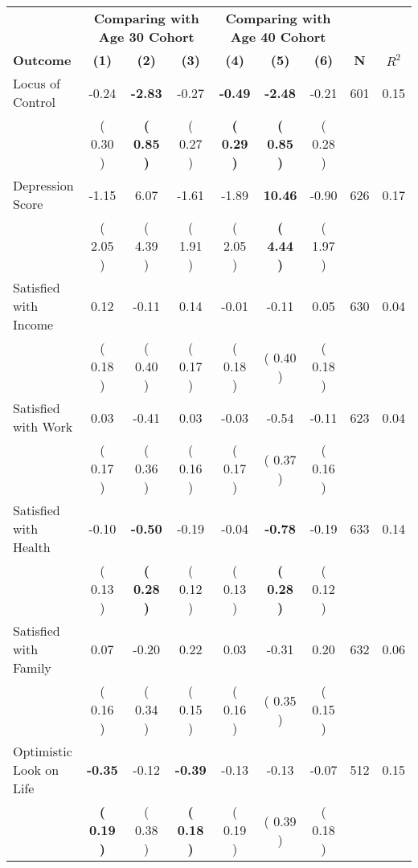 \begin{tabular}{lcccccccc}
\toprule
 & \multicolumn{3}{c}{\textbf{Comparing with Age 30 Cohort}} & \multicolumn{3}{c}{\textbf{Comparing with Age 40 Cohort}} & \\
\cmidrule(lr){2-4} \cmidrule(lr){5-7} 
 \textbf{Outcome} & \textbf{(1)} & \textbf{(2)} & \textbf{(3)} & \textbf{(4)} & \textbf{(5)} & \textbf{(6)} & \textbf{N} & \textbf{$ R^2$} \\
\midrule
Locus of Control &     -0.24 & \textbf{    -2.83} &     -0.27 & \textbf{    -0.49} & \textbf{    -2.48} &     -0.21 & 601 &       0.15 \\ 
 & (     0.30 ) & \textbf{(     0.85 )} & (     0.27 ) & \textbf{(     0.29 )} & \textbf{(     0.85 )} & (     0.28 ) & \\
Depression Score &     -1.15 &      6.07 &     -1.61 &     -1.89 & \textbf{    10.46} &     -0.90 & 626 &       0.17 \\ 
 & (     2.05 ) & (     4.39 ) & (     1.91 ) & (     2.05 ) & \textbf{(     4.44 )} & (     1.97 ) & \\
Satisfied with Income &      0.12 &     -0.11 &      0.14 &     -0.01 &     -0.11 &      0.05 & 630 &       0.04 \\ 
 & (     0.18 ) & (     0.40 ) & (     0.17 ) & (     0.18 ) & (     0.40 ) & (     0.18 ) & \\
Satisfied with Work &      0.03 &     -0.41 &      0.03 &     -0.03 &     -0.54 &     -0.11 & 623 &       0.04 \\ 
 & (     0.17 ) & (     0.36 ) & (     0.16 ) & (     0.17 ) & (     0.37 ) & (     0.16 ) & \\
Satisfied with Health &     -0.10 & \textbf{    -0.50} &     -0.19 &     -0.04 & \textbf{    -0.78} &     -0.19 & 633 &       0.14 \\ 
 & (     0.13 ) & \textbf{(     0.28 )} & (     0.12 ) & (     0.13 ) & \textbf{(     0.28 )} & (     0.12 ) & \\
Satisfied with Family &      0.07 &     -0.20 &      0.22 &      0.03 &     -0.31 &      0.20 & 632 &       0.06 \\ 
 & (     0.16 ) & (     0.34 ) & (     0.15 ) & (     0.16 ) & (     0.35 ) & (     0.15 ) & \\
Optimistic Look on Life & \textbf{    -0.35} &     -0.12 & \textbf{    -0.39} &     -0.13 &     -0.13 &     -0.07 & 512 &       0.15 \\ 
 & \textbf{(     0.19 )} & (     0.38 ) & \textbf{(     0.18 )} & (     0.19 ) & (     0.39 ) & (     0.18 ) & \\

\end{tabular}
